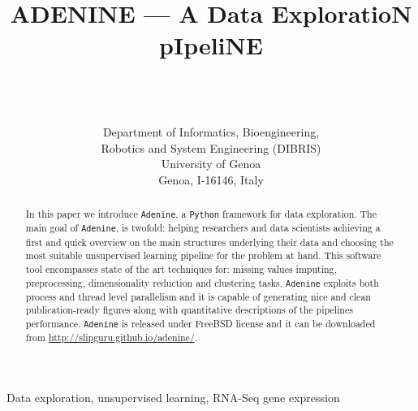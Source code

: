 \documentclass[twoside,11pt]{article}
\makeatletter
\newcommand{\ade}{\texttt{Adenine}\@\xspace}
\newcommand{\py}{\texttt{Python}\@\xspace}
\makeatother
\begin{document}
\title{ADENINE --- A Data ExploratioN pIpeliNE}

\author{ \\
 \\
 \\[1em]
\addr Department of Informatics, Bioengineering, \\Robotics and System Engineering (DIBRIS)\\
     University of Genoa\\
     Genoa, I-16146, Italy}



\maketitle

\begin{abstract}

In this paper we introduce \ade, a \py framework for data exploration. The main goal of \ade, is twofold: helping researchers and data scientists achieving a first and quick overview on the main structures underlying their data and choosing the most suitable unsupervised learning pipeline for the problem at hand. This software tool encompasses state of the art techniques for: missing values imputing, preprocessing, dimensionality reduction and clustering tasks.
\ade exploits both process and thread level parallelism and it is capable of generating nice and clean publication-ready figures along with quantitative descriptions of the pipelines performance. \ade is released under FreeBSD license and it can be downloaded from \href{http://slipguru.github.io/adenine/}{http://slipguru.github.io/adenine/}.


\end{abstract}

\begin{keywords}
Data exploration, unsupervised learning, RNA-Seq gene expression
\end{keywords}
\end{document}
